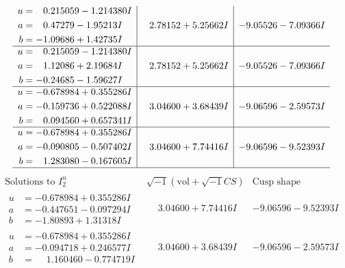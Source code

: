 \documentclass[1p]{elsarticle_modified}
\theoremstyle{definition}
\newcommand{\I}{\sqrt{-1}}
\begin{document}
$$\begin{array}{c|c|c}
\begin{aligned}
u &= \phantom{-}0.215059 - 1.214380 I \\
a &= \phantom{-}0.47279 - 1.95213 I \\
b &= -1.09686 + 1.42735 I\end{aligned}
 & \phantom{-}2.78152 + 5.25662 I & -9.05526 - 7.09366 I \\ \hline\begin{aligned}
u &= \phantom{-}0.215059 - 1.214380 I \\
a &= \phantom{-}1.12086 + 2.19684 I \\
b &= -0.24685 - 1.59627 I\end{aligned}
 & \phantom{-}2.78152 + 5.25662 I & -9.05526 - 7.09366 I \\ \hline\begin{aligned}
u &= -0.678984 + 0.355286 I \\
a &= -0.159736 + 0.522088 I \\
b &= \phantom{-}0.094560 + 0.657341 I\end{aligned}
 & \phantom{-}3.04600 + 3.68439 I & -9.06596 - 2.59573 I \\ \hline\begin{aligned}
u &= -0.678984 + 0.355286 I \\
a &= -0.090805 - 0.507402 I \\
b &= \phantom{-}1.283080 - 0.167605 I\end{aligned}
 & \phantom{-}3.04600 + 7.74416 I & -9.06596 - 9.52393 I\\
 \hline 
 \end{array}$$\newpage$$\begin{array}{c|c|c}  
\text{Solutions to }I^u_{2}& \I (\text{vol} + \sqrt{-1}CS) & \text{Cusp shape}\\
 \hline 
\begin{aligned}
u &= -0.678984 + 0.355286 I \\
a &= -0.447651 - 0.097294 I \\
b &= -1.80893 + 1.31318 I\end{aligned}
 & \phantom{-}3.04600 + 7.74416 I & -9.06596 - 9.52393 I \\ \hline\begin{aligned}
u &= -0.678984 + 0.355286 I \\
a &= -0.094718 + 0.246577 I \\
b &= \phantom{-}1.160460 - 0.774719 I\end{aligned}
 & \phantom{-}3.04600 + 3.68439 I & -9.06596 - 2.59573 I \\ \hline\begin{aligned}

\end{aligned}
\end{array}$$
\end{document}
